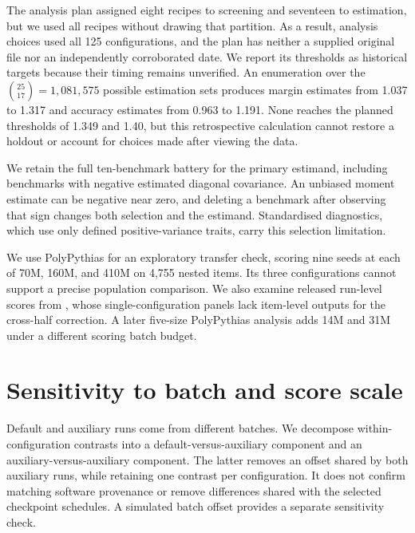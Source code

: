 \documentclass{article}
\begin{document}
The analysis plan assigned eight recipes to screening and seventeen to estimation, but we used all recipes without drawing that partition. As a result, analysis choices used all 125 configurations, and the plan has neither a supplied original file nor an independently corroborated date. We report its thresholds as historical targets because their timing remains unverified. An enumeration over the $\binom{25}{17}=1{,}081{,}575$ possible estimation sets produces margin estimates from 1.037 to 1.317 and accuracy estimates from 0.963 to 1.191. None reaches the planned thresholds of 1.349 and 1.40, but this retrospective calculation cannot restore a holdout or account for choices made after viewing the data.

We retain the full ten-benchmark battery for the primary estimand, including benchmarks with negative estimated diagonal covariance. An unbiased moment estimate can be negative near zero, and deleting a benchmark after observing that sign changes both selection and the estimand. Standardised diagnostics, which use only defined positive-variance traits, carry this selection limitation.

We use PolyPythias \citep{vanderwal2025} for an exploratory transfer check, scoring nine seeds at each of 70M, 160M, and 410M on 4,755 nested items. Its three configurations cannot support a precise population comparison. We also examine released run-level scores from \citet{heineman2025}, whose single-configuration panels lack item-level outputs for the cross-half correction. A later five-size PolyPythias analysis adds 14M and 31M under a different scoring batch budget.

\section{Sensitivity to batch and score scale}
Default and auxiliary runs come from different batches. We decompose within-configuration contrasts into a default-versus-auxiliary component and an auxiliary-versus-auxiliary component. The latter removes an offset shared by both auxiliary runs, while retaining one contrast per configuration. It does not confirm matching software provenance or remove differences shared with the selected checkpoint schedules. A simulated batch offset provides a separate sensitivity check.
\end{document}
